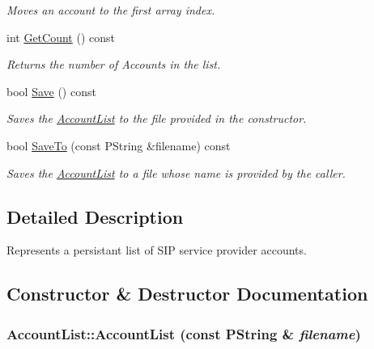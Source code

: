 \begin{CompactItemize}
\begin{CompactList}\small\item\em Moves an account to the first array index. \item\end{CompactList}\item 
int \hyperlink{classAccountList_b83a124132b34cf82e5601609776daf9}{GetCount} () const 
\begin{CompactList}\small\item\em Returns the number of Accounts in the list. \item\end{CompactList}\item 
bool \hyperlink{classAccountList_f070ee0999c8406ed4c79ba4e131545a}{Save} () const 
\begin{CompactList}\small\item\em Saves the \hyperlink{classAccountList}{AccountList} to the file provided in the constructor. \item\end{CompactList}\item 
bool \hyperlink{classAccountList_1a289fad4cfa2e10362a3de84e2bd091}{SaveTo} (const PString \&filename) const 
\begin{CompactList}\small\item\em Saves the \hyperlink{classAccountList}{AccountList} to a file whose name is provided by the caller. \item\end{CompactList}\end{CompactItemize}


\subsection{Detailed Description}
Represents a persistant list of SIP service provider accounts. 

\subsection{Constructor \& Destructor Documentation}
\hypertarget{classAccountList_8e8092c5a958a03625dc9ff1915c8225}{
\subsubsection[{AccountList}]{\setlength{\rightskip}{0pt plus 5cm}AccountList::AccountList (const PString \& {\em filename})}}
\label{classAccountList_8e8092c5a958a03625dc9ff1915c8225}


